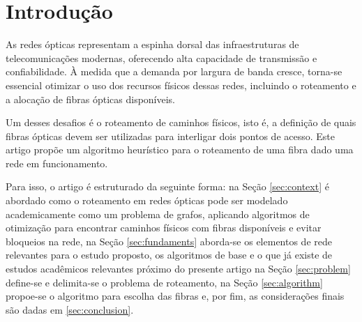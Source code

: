 \section{Introdução}

As redes ópticas representam a espinha dorsal das infraestruturas de
telecomunicações modernas, oferecendo alta capacidade de transmissão e
confiabilidade. À medida que a demanda por largura de banda cresce, torna-se
essencial otimizar o uso dos recursos físicos dessas redes, incluindo o
roteamento e a alocação de fibras ópticas disponíveis.

Um desses desafios é o roteamento de caminhos físicos, isto é, a definição de
quais fibras ópticas devem ser utilizadas para interligar dois pontos de
acesso. Este artigo propõe um algoritmo heurístico para o roteamento de uma
fibra dado uma rede em funcionamento.

Para isso, o artigo é estruturado da seguinte forma: na Seção \ref{sec:context}
é abordado como o roteamento em redes ópticas pode ser modelado academicamente
como um problema de grafos, aplicando algoritmos de otimização para encontrar
caminhos físicos com fibras disponíveis e evitar bloqueios na rede, na Seção
\ref{sec:fundaments} aborda-se os elementos de rede relevantes para o estudo
proposto, os algoritmos de base e o que já existe de estudos acadêmicos
relevantes próximo do presente artigo na Seção \ref{sec:problem} define-se e
delimita-se o problema de roteamento, na Seção \ref{sec:algorithm} propoe-se o
algoritmo para escolha das fibras e, por fim, as considerações finais são dadas
em \ref{sec:conclusion}.

